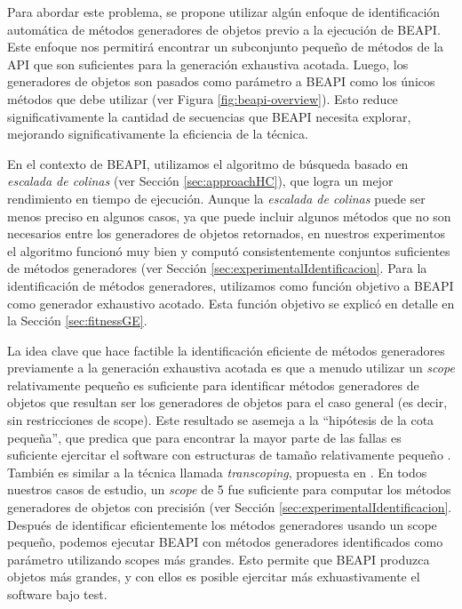 Para abordar este problema, se propone utilizar algún enfoque de identificación
automática de métodos generadores de objetos previo a la ejecución de BEAPI. 
Este enfoque nos permitirá encontrar un subconjunto pequeño de métodos de la API que son
suficientes para la generación exhaustiva acotada.
Luego, los generadores de objetos son pasados como parámetro a BEAPI como los
únicos métodos que debe utilizar (ver Figura \ref{fig:beapi-overview}). 
Esto reduce significativamente la cantidad de
secuencias que BEAPI necesita explorar, mejorando significativamente la
eficiencia de la técnica.

En el contexto de \textsf{BEAPI}, utilizamos el algoritmo de búsqueda basado en
\emph{escalada de colinas} (ver Sección \ref{sec:approachHC}), que logra un mejor rendimiento en tiempo de
ejecución. 
Aunque la \emph{escalada de colinas} puede ser menos preciso en algunos casos,
ya que puede incluir algunos métodos que no son necesarios entre los generadores
de objetos retornados, en nuestros experimentos el algoritmo funcionó muy bien y
computó consistentemente conjuntos suficientes de métodos generadores (ver
Sección \ref{sec:experimentalIdentificacion}. 
Para la identificación de métodos generadores, utilizamos como función objetivo
a BEAPI como generador exhaustivo acotado. Esta función objetivo se explicó en
detalle en la Sección \ref{sec:fitnessGE}.

La idea clave que hace factible la identificación eficiente de métodos generadores
previamente a la generación exhaustiva acotada es que a menudo utilizar un
\emph{scope} relativamente pequeño es suficiente para identificar métodos
generadores de objetos que resultan ser los generadores de objetos para el caso
general (es decir, sin restricciones de scope).
Este resultado se asemeja a la ``hipótesis de la cota pequeña'', que predica que
para encontrar la mayor parte de las fallas es suficiente ejercitar el software
con estructuras de tamaño relativamente pequeño \cite{Andoni02}. También es
similar a la técnica llamada \emph{transcoping}, propuesta en \cite{Rosner13}.
En todos nuestros casos de estudio, un \emph{scope} de 5 fue suficiente para
computar los métodos generadores de objetos con precisión (ver Sección
\ref{sec:experimentalIdentificacion}.
Después de identificar eficientemente los métodos generadores usando un scope
pequeño, podemos ejecutar \textsf{BEAPI} con métodos generadores identificados
como parámetro utilizando scopes más grandes. Esto permite que \textsf{BEAPI}
produzca objetos más grandes, y con ellos es posible ejercitar más exhuastivamente 
el software bajo test.

